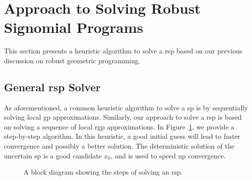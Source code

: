 \section{Approach to Solving Robust Signomial Programs}

This section presents a heuristic algorithm to solve a \gls{rsp}
based on our previous discussion on robust geometric programming.

\subsection{General \gls{rsp} Solver}
As aforementioned, a common heuristic algorithm to solve a \gls{sp} is
by sequentially solving local \gls{gp} approximations.
Similarly, our approach to solve a \gls{rsp} is based on solving
a sequence of local \gls{rgp} approximations. In Figure~\ref{fig:rspsolve},
we provide a step-by-step algorithm.
In this heuristic, a good initial guess will lead to faster
convergence and possibly a better solution.
The deterministic solution of the uncertain \gls{sp} is a good candidate $x_0$,
and is used to speed up convergence.

\begin{figure}
    \begin{center}
    \caption{A block diagram showing the steps of solving an \gls{rsp}.}
        \label{fig:rspsolve}
\end{center}
\end{figure}

